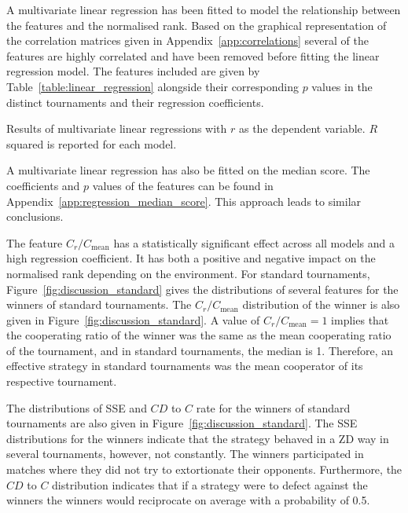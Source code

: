 \documentclass{article}
\begin{document}
A multivariate linear regression has been fitted to model the relationship between
the features and the normalised rank. Based on the graphical representation of
the correlation matrices given in Appendix~\ref{app:correlations} several of the
features are highly correlated and have been removed
before fitting the linear regression model. The features included are given
by Table~\ref{table:linear_regression} alongside their corresponding \(p\) values
in the distinct tournaments and their regression coefficients.

\begin{table}[h]
    \begin{center}
\resizebox{\textwidth}{!}{
    }
    \end{center}
    \caption{Results of multivariate linear regressions with \(r\) as the dependent variable.
    \(R\) squared is reported for each model.}
    \label{table:linear_regression}
\end{table}

A multivariate linear regression has also be fitted on the median score. The
coefficients and \(p\) values of the features can be found in
Appendix~\ref{app:regression_median_score}. This approach leads to similar conclusions.

The feature \(C_{r} / C_{\text{mean}}\) has a statistically significant effect
across all models and a high regression coefficient. It has both a positive and
negative impact on the normalised rank depending on the environment. For
standard tournaments, Figure~\ref{fig:discussion_standard} gives the
distributions of several features for the winners of standard tournaments. The
\(C_{r} / C_{\text{mean}}\) distribution of the winner is also given in
Figure~\ref{fig:discussion_standard}. A value of \(C_r / C_{\text{mean}} = 1\)
implies that the cooperating ratio of the winner was the same as the mean
cooperating ratio of the tournament, and in standard tournaments, the median is
1. Therefore, an effective strategy in standard tournaments was the mean
cooperator of its respective tournament.

The distributions of SSE and \(CD\) to \(C\) rate for the winners of standard
tournaments are also given in Figure~\ref{fig:discussion_standard}. The SSE
distributions for the winners indicate that the strategy behaved in a ZD way in
several tournaments, however, not constantly. The winners participated in
matches where they did not try to extortionate their opponents. Furthermore, the
\(CD\) to \(C\) distribution indicates that if a strategy were to defect against
the winners the winners would reciprocate on average with a probability of 0.5.
\end{document}
